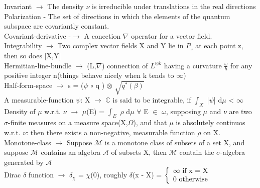 \documentclass[10pt,fancy]{elegantbook}
\begin{document}
{\begin{definition}
Invariant $\rightarrow$ The density $\nu$ is irreducible under translations in the real directions \\
 
Polarization - The set of directions in which the elements of the quantum subspace are covariantly constant.  \\
 
Covariant-derivative -$\rightarrow$ A conection $\nabla$ operator for a vector field.  \\
  
Integrability $\rightarrow$ Two complex vector fields X and Y lie in $P_z$ at each point z, then so does [X,Y] \\
 
Hermitian-line-bundle $\longrightarrow$ (L,$\nabla$) connection of $L^{{\otimes}{k}}$ having a curvature $\frac{\omega}{\hbar}$ for any positive integer n(things behave nicely when k tends to $\infty$)  \\

Half-form-space $\longrightarrow$ s = ($\psi$ $\circ$ q ) $\otimes$ $\sqrt{q^*(\beta)}$  \\

A measurable-function $\psi$: X $\longrightarrow$ $\mathbb C$ is said to be integrable,
if $\int_X$ |$\psi$| d$\mu$ < $\infty$    \\

Density of $\mu$ w.r.t. $\nu$ $\longrightarrow$ $\mu$(E) = $\int_E$ $\rho$ d$\mu$ $\forall$ E $\in$ $\omega$,
supposing $\mu$ and $\nu$ are two $\sigma$-finite measures on a measure space(X,$\Omega$), 
and that $\mu$ is absolutely continuos w.r.t. $\nu$: then there exists a non-negative, measurable function $\rho$ on X. \\
 
Monotone-class $\longrightarrow$ Suppose $\mathscr M$ is a monotone class of subsets of a set X, and suppose $\mathscr M$ contains an
algebra $\mathscr A$ of subsets X, then $\mathscr M$ contain the $\sigma$-algebra generated by $\mathscr A$ \\
 
Dirac $\delta$ function $\longrightarrow$ $\delta_\chi$ = $\chi$(0),  
    roughly $\delta$(x - X) = $\left\{
    \begin{array}{ll}
    \infty \text{ if x = X} \\
    0      \text{ otherwise} \\
    \end{array} \\
    \right.$ \\
 

\end{definition}}
\end{document}
